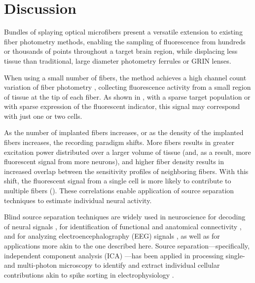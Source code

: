 \section{Discussion}

Bundles of splaying optical microfibers present a versatile extension to existing fiber photometry methods, enabling the sampling of fluorescence from hundreds or thousands of points throughout a target brain region, while displacing less tissue than traditional, large diameter photometry ferrules or GRIN lenses.

When using a small number of fibers, the method achieves a high channel count variation of fiber photometry \cite{Guo:2015gu}, collecting fluorescence activity from a small region of tissue at the tip of each fiber. As shown in , with a sparse target population or with sparse expression of the fluorescent indicator, this signal may correspond with just one or two cells.

As the number of implanted fibers increases, or as the density of the implanted fibers increases, the recording paradigm shifts. More fibers results in greater excitation power distributed over a larger volume of tissue (and, as a result, more fluorescent signal from more neurons), and higher fiber density results in increased overlap between the sensitivity profiles of neighboring fibers. With this shift, the fluorescent signal from a single cell is more likely to contribute to multiple fibers (). These correlations enable application of source separation techniques to estimate individual neural activity.

Blind source separation techniques are widely used in neuroscience for decoding of neural signals \cite{Makeig:1999vk}, for identification of functional and anatomical connectivity \cite{Randlett:2015gu}, and for analyzing electroencephalography (EEG) signals \cite{Makeig:1999vk}, as well as for applications more akin to the one described here. Source separation---specifically, independent component analysis (ICA) \cite{Hyvarinen:2000vk}---has been applied in processing single- and multi-photon microscopy to identify and extract individual cellular contributions akin to spike sorting in electrophysiology \cite{Mukamel:2009hd,Xu:2012hj,Patel:2015fi}.

